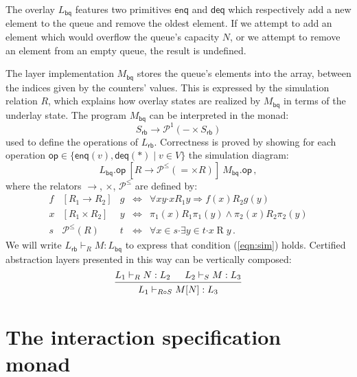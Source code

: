 \documentclass[sigplan,screen]{acmart}
\newcommand{\kw}[1]{\ensuremath{ \mathsf{#1} }}
\newcommand{\bdot}{\boldsymbol{\cdot}}
\begin{document}
The overlay $L_\kw{bq}$ features two primitives
$\kw{enq}$ and $\kw{deq}$
which respectively add a new element to the queue
and remove the oldest element.
If we attempt to add an element
which would overflow the queue's capacity $N$,
or we attempt to remove an element from an empty queue,
the result is undefined.

The layer implementation $M_\kw{bq}$ 
stores the queue's elements into the array,
between the indices given by the counters' values.
This is expressed by the simulation relation $R$,
which explains how overlay states are realized by $M_\kw{bq}$ 
in terms of the underlay state.
The program $M_\kw{bq}$ can be interpreted in the monad:
\[
    S_\kw{rb} \rightarrow \mathcal{P}^1(- \times S_\kw{rb})
\]
used to define the operations of $L_\kw{rb}$.
Correctness is proved by showing
for each operation
$\kw{op} \in \{ \kw{enq}(v), \kw{deq}(*) \mid v \in V \}$
the simulation diagram:
\begin{equation}
  \label{eqn:sim}
  L_\kw{bq}.\kw{op}
  \: \mathrel{[R \rightarrow \mathcal{P}^\le({=} \times R)]} \:
  M_\kw{bq}.\kw{op} \,,
\end{equation}
where the relators $\rightarrow$, $\times$, $\mathcal{P}^\le$
are defined by:
\[
  \begin{array}{rclcl}
    f & [R_1 \rightarrow R_2] & g & \Leftrightarrow &
    \forall x y \bdot x \mathrel{R_1} y \Rightarrow
    f(x) \mathrel{R_2} g(y) \\
  x & [R_1 \times R_2] & y & \Leftrightarrow &
    \pi_1(x) \mathrel{R_1} \pi_1(y) \wedge
    \pi_2(x) \mathrel{R_2} \pi_2(y) \\
  s & \mathcal{P}^\le(R) & t & \Leftrightarrow &
    \forall x \in s \bdot \exists y \in t \bdot x \mathrel{R} y \,.
  \end{array}
\]
We will write $L_\kw{rb} \vdash_R M : L_\kw{bq}$
to express that condition (\ref{eqn:sim}) holds.
Certified abstraction layers presented in this way
can be vertically composed:
\[
  \begin{prooftree}
    \hypo{L_1 \vdash_R N : L_2}
    \hypo{L_2 \vdash_S M : L_3}
    \infer2{L_1 \vdash_{R \circ S} M[N] : L_3}
  \end{prooftree}
\]



\section{The interaction specification monad} \label{sec:intspec} %
\end{document}

